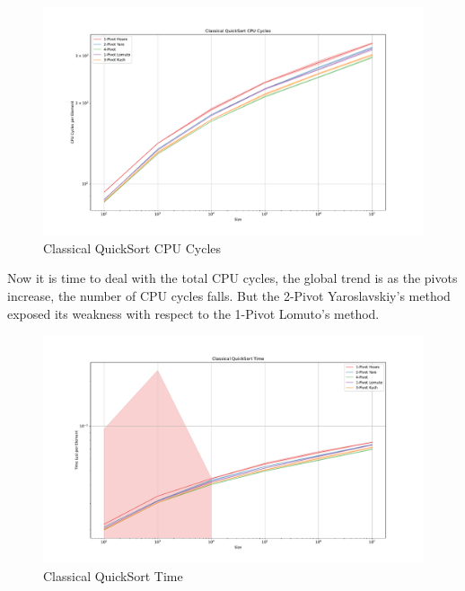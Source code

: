 \documentclass[a4paper,oneside,12pt]{book}
\begin{document}
\begin{figure}[H]
    \hypertarget{fig:classicalcpucycles}{}
    \caption{Classical QuickSort CPU Cycles}
    \centering
    \hspace*{-0.27\textwidth}
    \includegraphics[width=1.5\textwidth]{Classical QuickSort CPU Cycles.pdf}
\end{figure}

Now it is time to deal with the total CPU cycles, the global trend is as the pivots increase, the number of CPU cycles falls.
But the 2-Pivot Yaroslavskiy's method exposed its weakness with respect to the 1-Pivot Lomuto's method. 

\begin{figure}[H]
    \hypertarget{fig:classicaltime}{}
    \caption{Classical QuickSort Time}
    \centering
    \hspace*{-0.27\textwidth}
    \includegraphics[width=1.5\textwidth]{Classical QuickSort Time.pdf}
\end{figure}
\end{document}
